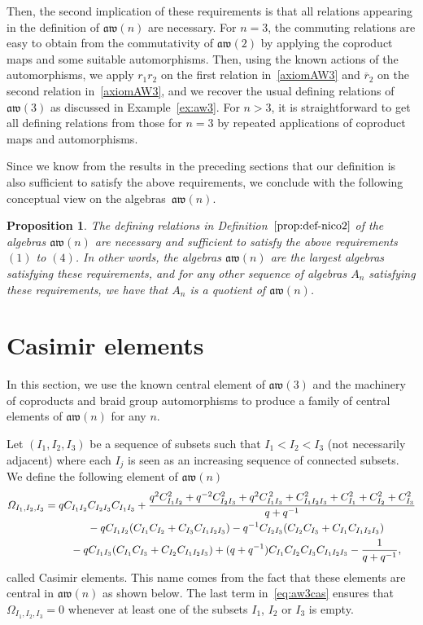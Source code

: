 \documentclass[10pt,a4paper]{amsart}
\numberwithin{equation}{section}
\newtheorem{prop}[theo]{Proposition}
\theoremstyle{definition}
\newcommand{\rb}{\overline{r}}
\newcommand{\aw}{\mathfrak{aw}(n)}
\begin{document}
Then, the second implication of these requirements is that all relations appearing in the definition of $\aw$ are necessary. For $n=3$, the commuting relations are easy to obtain from the commutativity of $\mathfrak{aw}(2)$ by applying the coproduct maps and some suitable automorphisms. Then, using the known actions of the automorphisms, we apply $r_1r_2$ on the first relation in~\eqref{axiomAW3} and $\rb_2$ on the second relation in~\eqref{axiomAW3}, and we recover the usual defining relations of $\mathfrak{aw}(3)$ as discussed in Example~\ref{ex:aw3}. For $n>3$, it is straightforward to get all defining relations from those for $n=3$ by repeated applications of coproduct maps and automorphisms.

Since we know from the results in the preceding sections that our definition is also sufficient to satisfy the above requirements, we conclude with the following conceptual view on the algebras~$\aw$.
\begin{prop}%
The defining relations in Definition~$\ref{prop:def-nico2}$ of the algebras $\aw$ are necessary and sufficient to satisfy the above requirements $(1)$ to $(4)$. In other words, the algebras $\aw$ are the largest algebras satisfying these requirements, and for any other sequence of algebras $A_n$ satisfying these requirements, we have that $A_n$ is a quotient of $\aw$.
\end{prop}


\section{Casimir elements}\label{sec-Cas}
In this section, we use the known central element of $\mathfrak{aw}(3)$ and the machinery of coproducts and braid group automorphisms to produce a family of central elements of $\aw$ for any $n$.

\medskip
Let $(I_1,I_2,I_3)$ be a sequence of subsets such that $I_1<I_2<I_3$ (not necessarily adjacent) where each $I_j$ is seen as an increasing sequence of connected subsets. We define the following element of $\aw$
\begin{gather}
 \varOmega_{I_1,I_2,I_3} = qC_{I_1I_2}C_{I_2I_3}C_{I_1I_3}+\frac{q^{2}C_{I_1I_2}^{2}+q^{-2}C_{I_2I_3}^{2}+q^{2}C_{I_1I_3}^{\,2}+C_{I_1I_2I_3}^{2} +
 C_{I_1}^{2}+C_{I_2}^{2}+C_{I_3}^{2} }{q+q^{-1}}\nonumber \\
\hphantom{\varOmega_{I_1,I_2,I_3} =}{}-qC_{I_1I_2}(C_{I_1}C_{I_2}+C_{I_3}C_{I_1I_2I_3}) -q^{-1}C_{I_2I_3}(C_{I_2}C_{I_3}+C_{I_1}C_{I_1I_2I_3}) \nonumber \\
\hphantom{\varOmega_{I_1,I_2,I_3} =}{}
-qC_{I_1I_3}(C_{I_1}C_{I_3}+C_{I_2}C_{I_1I_2I_3})+(q+q^{-1})C_{I_1}C_{I_2}C_{I_3}C_{I_1I_2I_3}
-\frac{1}{q+q^{-1}} ,\label{eq:aw3cas}
\end{gather}
called Casimir elements. This name comes from the fact that these elements are central in $\aw$ as shown below.
The last term in~\eqref{eq:aw3cas} ensures that $\varOmega_{I_1,I_2,I_3}=0$ whenever at least one of the subsets $I_1$, $I_2$ or $I_3$ is empty.
\end{document}
